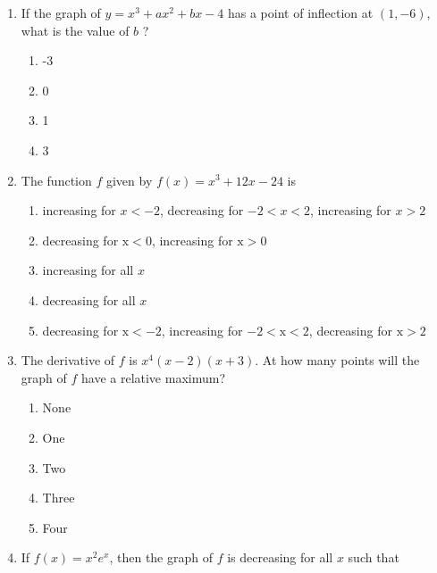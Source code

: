 \documentclass{article}
\begin{document}
\begin{enumerate}
	\item
	\begin{minipage}[t]{\linewidth}
		If the graph of \(y=x^{3}+a x^{2}+b x-4\) has a point of inflection at
\((1,-6)\), what is the value of \(b\) ?
\vspace{1em}
		\begin{enumerate}
		\itemsep1em
			\item -3
			\item 0
			\item 1
			\item 3
		\end{enumerate}
	\end{minipage}
	\item
	\begin{minipage}[t]{\linewidth}
		The function \(f\) given by \(f(x)=x^{3}+12 x-24\) is
\vspace{1em}
		\begin{enumerate}
		\itemsep1em
			\item increasing for \(x<-2\), decreasing for \(-2<x<2\), increasing for
\(x>2\)
			\item decreasing for \(\mathrm{x}<0\), increasing for \(\mathrm{x}>0\)
			\item increasing for all \(x\)
			\item decreasing for all \(x\)
			\item decreasing for \(\mathrm{x}<-2\), increasing for \(-2<\mathrm{x}<2\),
decreasing for \(\mathrm{x}>2\)
		\end{enumerate}
	\end{minipage}
	\item
	\begin{minipage}[t]{\linewidth}
		The derivative of \(f\) is \(x^{4}(x-2)(x+3)\). At how many points will
the graph of \(f\) have a relative maximum?
\vspace{1em}
		\begin{enumerate}
		\itemsep1em
			\item None
			\item One
			\item Two
			\item Three
			\item Four
		\end{enumerate}
	\end{minipage}
	\item
	\begin{minipage}[t]{\linewidth}
		If \(f(x)=x^{2} e^{x}\), then the graph of \(f\) is decreasing for all
\(x\) such that
\vspace{1em}

\end{minipage}
\end{enumerate}
\end{document}
